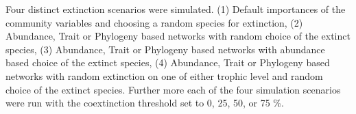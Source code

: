 \documentclass[12pt,a4paper]{article}
\begin{document}
			
 Four distinct extinction scenarios were simulated. (1) Default importances of the community variables and choosing a random species for extinction, (2) Abundance, Trait or Phylogeny based networks with random choice of the extinct species, (3) Abundance, Trait or Phylogeny based networks with abundance based choice of the extinct species, (4) Abundance, Trait or Phylogeny based networks with random extinction on one of either trophic level and random choice of the extinct species.
 Further more each of the four simulation scenarios were run with the coextinction threshold set to 0, 25, 50, or 75 \%. 
 
\end{document}
